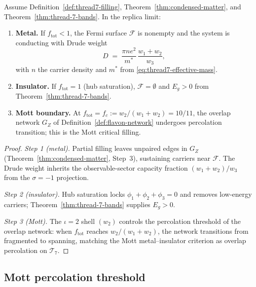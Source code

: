 \begin{proposition}
\label{prop:thread7-metal-insulator}
Assume Definition~\ref{def:thread7-filling},
Theorem~\ref{thm:condensed-matter}, and Theorem~\ref{thm:thread-7-bands}.
In the replica limit:
\begin{enumerate}[label=(\roman*),leftmargin=*]
  \item \textbf{Metal.}
    If $f_{\mathrm{tot}}<1$, the Fermi surface $\mathcal{F}$ is nonempty and
    the system is conducting with Drude weight
    \begin{equation}\label{eq:thread7-drude}
      D
      \;=\;
      \frac{\pi n e^2}{m^*}\,
      \frac{w_1+w_2}{w_3},
    \end{equation}
    with $n$ the carrier density and $m^*$ from \eqref{eq:thread7-effective-mass}.
  \item \textbf{Insulator.}
    If $f_{\mathrm{tot}}=1$ (hub saturation), $\mathcal{F}=\emptyset$ and
    $E_g>0$ from Theorem~\ref{thm:thread-7-bands}.
  \item \textbf{Mott boundary.}
    At $f_{\mathrm{tot}}=f_c:=w_2/(w_1+w_2)=10/11$, the overlap network
    $G_Z$ of Definition~\ref{def:flavon-network} undergoes percolation
    transition; this is the Mott critical filling.
\end{enumerate}
\end{proposition}

\begin{proof}
\emph{Step 1 (metal).}
Partial filling leaves unpaired edges in $G_Z$ (Theorem~\ref{thm:condensed-matter},
Step~3), sustaining carriers near $\mathcal{F}$. The Drude weight inherits the
observable-sector capacity fraction $(w_1+w_2)/w_3$ from the $\sigma=-1$
projection.

\emph{Step 2 (insulator).}
Hub saturation locks $\phi_1+\phi_2+\phi_3=0$ and removes low-energy carriers;
Theorem~\ref{thm:thread-7-bands} supplies $E_g>0$.

\emph{Step 3 (Mott).}
The $\iota=2$ shell $(w_2)$ controls the percolation threshold of the overlap
network: when $f_{\mathrm{tot}}$ reaches $w_2/(w_1+w_2)$, the network
transitions from fragmented to spanning, matching the Mott metal--insulator
criterion as overlap percolation on $\mathcal{T}_7$.
\end{proof}

\subsection{Mott percolation threshold}
\label{sec:wave4-thread7:mott}

